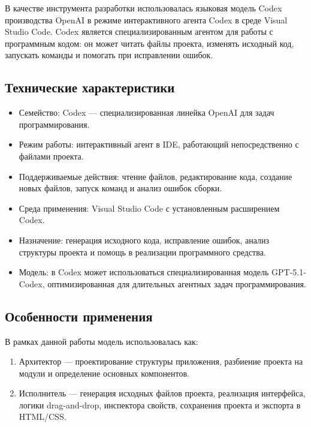 \documentclass[14pt,a4paper]{extarticle}
\begin{document}
{{В качестве инструмента разработки использовалась языковая модель Codex производства OpenAI в режиме интерактивного агента Codex в среде Visual Studio Code. Codex является специализированным агентом для работы с программным кодом: он может читать файлы проекта, изменять исходный код, запускать команды и помогать при исправлении ошибок.

\subsection{Технические характеристики}

\begin{itemize}
    \item Семейство: Codex --- специализированная линейка OpenAI для задач программирования.

    \item Режим работы: интерактивный агент в IDE, работающий непосредственно с файлами проекта.

    \item Поддерживаемые действия: чтение файлов, редактирование кода, создание новых файлов, запуск команд и анализ ошибок сборки.

    \item Среда применения: Visual Studio Code с установленным расширением Codex.

    \item Назначение: генерация исходного кода, исправление ошибок, анализ структуры проекта и помощь в реализации программного средства.

    \item Модель: в Codex может использоваться специализированная модель GPT-5.1-Codex, оптимизированная для длительных агентных задач программирования.
\end{itemize}

\subsection{Особенности применения}

В рамках данной работы модель использовалась как:

\begin{enumerate}
    \item Архитектор --- проектирование структуры приложения, разбиение проекта на модули и определение основных компонентов.

    \item Исполнитель --- генерация исходных файлов проекта, реализация интерфейса, логики drag-and-drop, инспектора свойств, сохранения проекта и экспорта в HTML/CSS.


\end{enumerate}}}
\end{document}
